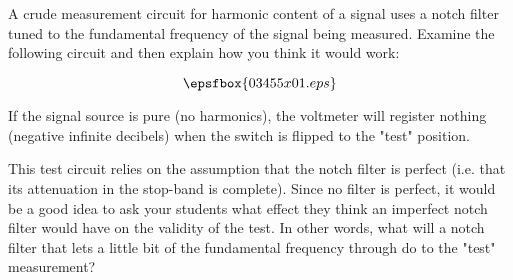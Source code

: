 

A crude measurement circuit for harmonic content of a signal uses a notch filter tuned to the fundamental frequency of the signal being measured.  Examine the following circuit and then explain how you think it would work:

$$\epsfbox{03455x01.eps}$$







If the signal source is pure (no harmonics), the voltmeter will register nothing (negative infinite decibels) when the switch is flipped to the "test" position.







This test circuit relies on the assumption that the notch filter is perfect (i.e. that its attenuation in the stop-band is complete).  Since no filter is perfect, it would be a good idea to ask your students what effect they think an imperfect notch filter would have on the validity of the test.  In other words, what will a notch filter that lets a little bit of the fundamental frequency through do to the "test" measurement?




